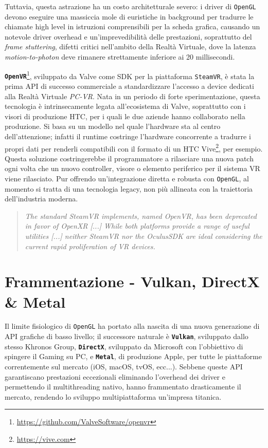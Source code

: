\documentclass[a4paper, 11pt, twoside]{report}
\begin{document}
Tuttavia, questa astrazione ha un costo architetturale severo: i driver di \texttt{OpenGL} devono eseguire una massiccia
mole di euristiche in background per tradurre le chiamate high level in istruzioni comprensibili per la scheda grafica,
causando un notevole driver overhead e un'imprevedibilità delle prestazioni, soprattutto del \textit{frame stuttering},
difetti critici nell'ambito della Realtà Virtuale, dove la latenza \textit{motion-to-photon} deve rimanere strettamente
inferiore ai 20 millisecondi.

\textbf{\texttt{\gls{OpenVR}}}\footnote{\url{https://github.com/ValveSoftware/openvr}}, sviluppato da Valve come SDK per
la piattaforma \texttt{SteamVR}, è stata la prima API di successo commerciale a standardizzare l'accesso a device
dedicati alla Realtà Virtuale \textit{PC-VR}.
Nata in un periodo di forte sperimentazione, questa tecnologia è intrinsecamente legata all'ecosistema di Valve,
soprattutto con i visori di produzione HTC, per i quali le due aziende hanno collaborato nella produzione.
Si basa su un modello nel quale l'hardware sta al centro dell'attenzione; infatti il runtime costringe l'hardware
concorrente a tradurre i propri dati per renderli compatibili con il formato di un HTC
Vive\footnote{\url{https://vive.com}}, per esempio.
Questa soluzione costringerebbe il programmatore a rilasciare una nuova patch ogni volta che un nuovo controller,
visore o elemento periferico per il sistema VR viene rilasciato.
Pur offrendo un'integrazione diretta e robusta con \texttt{OpenGL}, al momento si tratta di una tecnologia legacy,
non più allineata con la traiettoria dell'industria moderna.

\begin{quote}
\itshape
The standard SteamVR implements, named OpenVR, has been deprecated in favor of OpenXR [...] While both platforms provide
a range of useful utilities [...] neither SteamVR nor the OculusSDK are ideal considering the current rapid
proliferation of VR devices. \cite{dahl2023umuvr}
\end{quote}

\section{Frammentazione - \gls{Vulkan}, \gls{DirectX} \& \gls{Metal}}

Il limite fisiologico di \texttt{OpenGL} ha portato alla nascita di una nuova generazione di API grafiche di basso
livello; il successore naturale è \textbf{\texttt{\gls{Vulkan}}}, sviluppato dallo stesso Khronos Group,
\textbf{\texttt{\gls{DirectX}}}, sviluppato da Microsoft con l'obbiettivo di spingere il Gaming su PC, e 
\textbf{\texttt{\gls{Metal}}}, di produzione Apple, per tutte le piattaforme correntemente sul mercato (iOS, macOS,
tvOS, ecc...). Sebbene queste API garantiscano prestazioni eccezionali eliminando l'overhead dei driver e permettendo il
multithreading nativo, hanno frammentato drasticamente il mercato, rendendo lo sviluppo multipiattaforma un'impresa
titanica.
\end{document}
